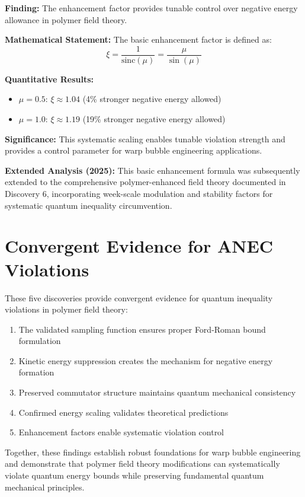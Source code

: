 \documentclass[11pt]{article}
\begin{document}
\textbf{Finding:} The enhancement factor provides tunable control over negative energy allowance in polymer field theory.

\textbf{Mathematical Statement:}
The basic enhancement factor is defined as:
$$\xi = \frac{1}{\text{sinc}(\mu)} = \frac{\mu}{\sin(\mu)}$$

\textbf{Quantitative Results:}
\begin{itemize}
    \item $\mu = 0.5$: $\xi \approx 1.04$ (4\% stronger negative energy allowed)
    \item $\mu = 1.0$: $\xi \approx 1.19$ (19\% stronger negative energy allowed)
\end{itemize}

\textbf{Significance:} This systematic scaling enables tunable violation strength and provides a control parameter for warp bubble engineering applications.

\textbf{Extended Analysis (2025):} This basic enhancement formula was subsequently extended to the comprehensive polymer-enhanced field theory documented in Discovery 6, incorporating week-scale modulation and stability factors for systematic quantum inequality circumvention.

\section{Convergent Evidence for ANEC Violations}

These five discoveries provide convergent evidence for quantum inequality violations in polymer field theory:

\begin{enumerate}
    \item The validated sampling function ensures proper Ford-Roman bound formulation
    \item Kinetic energy suppression creates the mechanism for negative energy formation
    \item Preserved commutator structure maintains quantum mechanical consistency
    \item Confirmed energy scaling validates theoretical predictions
    \item Enhancement factors enable systematic violation control
\end{enumerate}

Together, these findings establish robust foundations for warp bubble engineering and demonstrate that polymer field theory modifications can systematically violate quantum energy bounds while preserving fundamental quantum mechanical principles.
\end{document}
